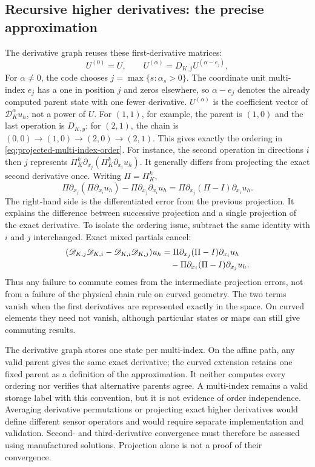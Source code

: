\subsection{Recursive higher derivatives: the precise approximation}
\label{sec:curved-recursive-derivatives}
The derivative graph reuses these first-derivative matrices:
\begin{equation}
 U^{(0)}=U,\qquad U^{(\alpha)}=D_{K,j}U^{(\alpha-e_j)},
 \label{eq:curved-recursion}
\end{equation}
For $\alpha\ne0$, the code chooses $j=\max\{s:\alpha_s>0\}$.
The coordinate unit multi-index $e_j$ has a one in position $j$ and zeros
elsewhere, so $\alpha-e_j$ denotes the already computed parent state with
one fewer derivative. $U^{(\alpha)}$ is the coefficient vector of
$\mathscr D_K^\alpha u_h$, not a power of $U$. For $(1,1)$, for example,
the parent is $(1,0)$ and the last operation is $D_{K,y}$; for $(2,1)$,
the chain is $(0,0)\to(1,0)\to(2,0)\to(2,1)$. This gives exactly the
ordering in \cref{eq:projected-multi-index-order}.
For instance, the second operation in directions $i$ then $j$ represents
$\Pi_K^k\partial_{x_j}(\Pi_K^k\partial_{x_i}u_h)$. It generally differs
from projecting the exact second derivative once. Writing $\Pi=\Pi_K^k$,
\begin{equation}
 \Pi\partial_{x_j}(\Pi\partial_{x_i}u_h)
 -\Pi\partial_{x_j}\partial_{x_i}u_h
 =\Pi\partial_{x_j}(\Pi-I)\partial_{x_i}u_h.
 \label{eq:curved-recursion-defect}
\end{equation}
The right-hand side is the differentiated error from the previous projection.
It explains the difference between successive projection and a single
projection of the exact derivative. To isolate the ordering issue, subtract
the same identity with $i$ and $j$ interchanged. Exact mixed partials cancel:
\begin{align}
 (\mathscr D_{K,j}\mathscr D_{K,i}
   -\mathscr D_{K,i}\mathscr D_{K,j})u_h
 &=\Pi\partial_{x_j}(\Pi-I)\partial_{x_i}u_h\notag\\
 &\quad-\Pi\partial_{x_i}(\Pi-I)\partial_{x_j}u_h.
 \label{eq:curved-commutator}
\end{align}
Thus any failure to commute comes from the intermediate projection errors,
not from a failure of the physical chain rule on curved geometry. The two
terms vanish when the first derivatives are represented exactly in the
space. On curved elements they need not vanish, although particular states
or maps can still give commuting results.

The derivative graph stores one state per multi-index. On the affine path,
any valid parent gives the same exact derivative; the curved extension
retains one fixed parent as a definition of the approximation. It neither
computes every ordering nor verifies that alternative parents agree.
A multi-index remains a valid storage label with this convention, but it is
not evidence of order independence. Averaging derivative permutations or
projecting exact higher derivatives would define different sensor operators
and would require separate implementation and validation. Second- and
third-derivative convergence must therefore be assessed using
manufactured solutions. Projection alone is not a proof of their convergence.

